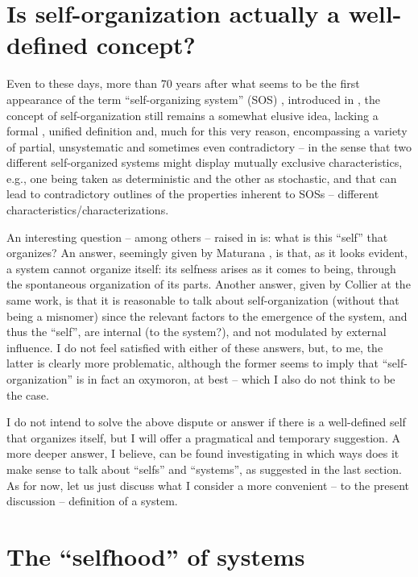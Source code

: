 \documentclass[12pt, a4paper]{article} %
\theoremstyle{definition}
\begin{document}
	\section{Is self-organization actually a well-defined concept?}
	
	Even to these days, more than 70 years after what seems to be the first appearance of the term ``self-organizing system'' (SOS) \cite{Gershenson2020, Banzhaf2009}, introduced in \cite{Ashby1947}, the concept of self-organization still remains a somewhat elusive idea, lacking a formal \cite{Gershenson2020}, unified definition and, much for this very reason, encompassing a variety of partial, unsystematic and sometimes even contradictory -- in the sense that two different self-organized systems might display mutually exclusive characteristics, e.g., one being taken as deterministic and the other as stochastic, and that can lead to contradictory outlines of the properties inherent to SOSs  -- different characteristics/characterizations.
	
	An interesting question -- among others -- raised in \cite{Collier2004} is: what is this ``self'' that organizes? An answer, seemingly given by Maturana \cite{Collier2004}, is that, as it looks evident, a system cannot organize itself: its selfness arises as it comes to being, through the spontaneous organization of its parts. Another answer, given by Collier at the same work, is that it is reasonable to talk about self-organization (without that being a misnomer) since the relevant factors to the emergence of the system, and thus the ``self'', are internal (to the system?), and not modulated by external influence. I do not feel satisfied with either of these answers, but, to me, the latter is clearly more problematic, although the former seems to imply that ``self-organization'' is in fact an oxymoron, at best -- which I also do not think to be the case.
	
	I do not intend to solve the above dispute or answer if there is a well-defined self that organizes itself, but I will offer a pragmatical and temporary suggestion. A more deeper answer, I believe, can be found investigating in which ways does it make sense to talk about ``selfs'' and ``systems'', as suggested in the last section. As for now, let us just discuss what I consider a more convenient -- to the present discussion -- definition of a system.
	
	\section{The ``selfhood'' of systems}
	
\end{document}
